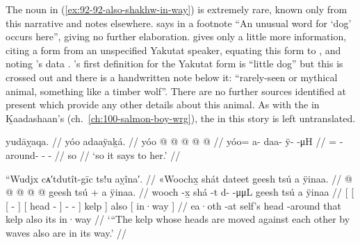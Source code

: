 The noun  in (\ref{ex:92-92-also-shakhw-in-way}) is extremely rare, known only from this narrative and notes elsewhere.
\citeauthor{swanton:1909} says in a footnote “An unusual word for ‘dog’ occurs here”, giving no further elaboration.
\citeauthor{leer:1973} gives only a little more information, citing a form  from an unspecified Yakutat speaker, equating this form to , and noting \citeauthor{swanton:1909}’s data \parencite[10/45]{leer:1973}.
\citeauthor{leer:1973}’s first definition for the Yakutat form  is “little dog” but this is crossed out and there is a handwritten note below it: “rarely-seen or mythical animal, something like a timber wolf”.
There are no further sources identified at present which provide any other details about this animal.
As with the  in Ḵaadashaan’s  (ch.\ \ref{ch:100-salmon-boy-wrg}), the  in this story is left untranslated.

\ex\label{ex:92-93-says-to-her}%
%
\begingl
	\glpreamble	yudāỵaqa. //
	\glpreamble	yóo adaaÿaḵá. //
	\gla	yóo @  @ {} @ {} @ {} @ {} //
	\glb	yóo= a- daa- ÿ-  -μH //
	\glc	{}= - around- -  - //
	\gld	so  {} {} {} {} //
	\glft	‘so it says to her.’
		//
\endgl
\xe

\ex\label{ex:92-94-also-wave-kelp-in-way}%
%
\begingl
	\glpreamble	“Wudjx cᴀ′tdutît-gīc ts!u aỵîna′. //
	\glpreamble	«\!Woochx̱ shát dateet geesh tsú a ÿinaa. //
	\gla	{} {} {}  @ {} {} {} {}  @ {} {}
			 @ {} @ {} @ {} {} geesh {} tsú +
		{} a ÿinaa. {} //
	\glb	{} {} {} wooch -x̱ {} {} {} shá -t {}
			d-  -μμL {} {} geesh {} tsú
		{} a ÿinaa {} //
	\glc	{}[ {}[ {}[  - {}]
			{}[  head - {}]
			-  - \· {}] kelp {}] also
		{}[  in·way {}] //
	\gld	{} {} {} ea·oth -at {} {} self’s head -around {}
			 {} {} \·that {} kelp {} also
		{} its in·way {} //
	\glft	‘“The kelp whose heads are moved against each other by waves also are in its way.’
		//
\endgl
\xe


